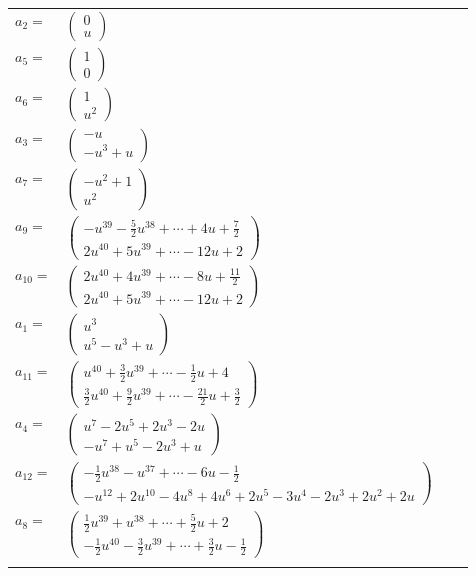 \documentclass[1p]{elsarticle_modified}
\theoremstyle{definition}
\begin{document}
\begin{tabular}{m{7pt} m{180pt} m{7pt} m{180pt} }
\flushright $a_{2}=$&$\begin{pmatrix}0\\u\end{pmatrix}$ \\
\flushright $a_{5}=$&$\begin{pmatrix}1\\0\end{pmatrix}$ \\
\flushright $a_{6}=$&$\begin{pmatrix}1\\u^2\end{pmatrix}$ \\
\flushright $a_{3}=$&$\begin{pmatrix}- u\\- u^3+u\end{pmatrix}$ \\
\flushright $a_{7}=$&$\begin{pmatrix}- u^2+1\\u^2\end{pmatrix}$ \\
\flushright $a_{9}=$&$\begin{pmatrix}- u^{39}-\frac{5}{2} u^{38}+\cdots+4 u+\frac{7}{2}\\2 u^{40}+5 u^{39}+\cdots-12 u+2\end{pmatrix}$ \\
\flushright $a_{10}=$&$\begin{pmatrix}2 u^{40}+4 u^{39}+\cdots-8 u+\frac{11}{2}\\2 u^{40}+5 u^{39}+\cdots-12 u+2\end{pmatrix}$ \\
\flushright $a_{1}=$&$\begin{pmatrix}u^3\\u^5- u^3+u\end{pmatrix}$ \\
\flushright $a_{11}=$&$\begin{pmatrix}u^{40}+\frac{3}{2} u^{39}+\cdots-\frac{1}{2} u+4\\\frac{3}{2} u^{40}+\frac{9}{2} u^{39}+\cdots-\frac{21}{2} u+\frac{3}{2}\end{pmatrix}$ \\
\flushright $a_{4}=$&$\begin{pmatrix}u^7-2 u^5+2 u^3-2 u\\- u^7+u^5-2 u^3+u\end{pmatrix}$ \\
\flushright $a_{12}=$&$\begin{pmatrix}-\frac{1}{2} u^{38}- u^{37}+\cdots-6 u-\frac{1}{2}\\- u^{12}+2 u^{10}-4 u^8+4 u^6+2 u^5-3 u^4-2 u^3+2 u^2+2 u\end{pmatrix}$ \\
\flushright $a_{8}=$&$\begin{pmatrix}\frac{1}{2} u^{39}+u^{38}+\cdots+\frac{5}{2} u+2\\-\frac{1}{2} u^{40}-\frac{3}{2} u^{39}+\cdots+\frac{3}{2} u-\frac{1}{2}\end{pmatrix}$\\&\end{tabular}
\end{document}
